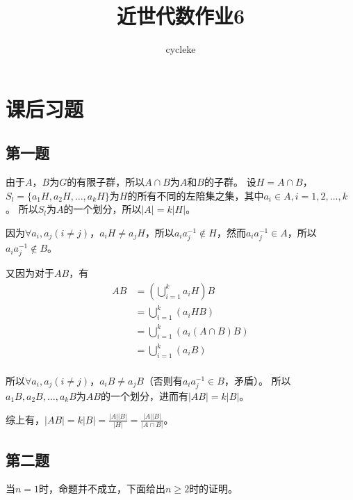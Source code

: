 \documentclass[12pt,onecolumn]{article}
\title{近世代数作业6}
\author{cycleke}
\theoremstyle{plain}
\begin{document}
\maketitle
\tableofcontents
\clearpage

\section{课后习题}

\subsection{第一题}
\begin{proof*}
  由于$A$，$B$为$G$的有限子群，所以$A \cap B$为$A$和$B$的子群。
  设$H = A \cap B$，$S_l = \{a_1H, a_2H, \ldots, a_k H\}$为$H$的所有不同的左陪集之集，其中$a_i \in A, i = 1, 2, \ldots, k$。
  所以$S_l$为$A$的一个划分，所以$|A| = k|H|$。

  因为$\forall a_i, a_j(i \neq j)$，$a_iH \neq a_j H$，所以$a_i a_j^{-1} \notin H$，然而$a_i a_j^{-1} \in A$，所以$a_i a_j^{-1} \notin B$。

  又因为对于$AB$，有
  \begin{align*}
    AB & = (\bigcup_{i = 1}^{k} a_i H) B         \\
       & = \bigcup_{i = 1}^{k}(a_i H B)          \\
       & = \bigcup_{i = 1}^{k}(a_i (A \cap B) B) \\
       & = \bigcup_{i = 1}^{k}(a_i B)            \\
  \end{align*}

  所以$\forall a_i, a_j(i \neq j)$，$a_i B \neq a_j B$（否则有$a_i a_j^{-1} \in B$，矛盾）。
  所以$a_1 B, a_2 B, \ldots, a_k B$为$AB$的一个划分，进而有$|AB| = k|B|$。

  综上有，$|AB| = k|B| = \frac{|A||B|}{|H|} = \frac{|A||B|}{|A \cap B|}$。
\end{proof*}

\subsection{第二题}
当$n = 1$时，命题并不成立，下面给出$n \geq 2$时的证明。
\end{document}
